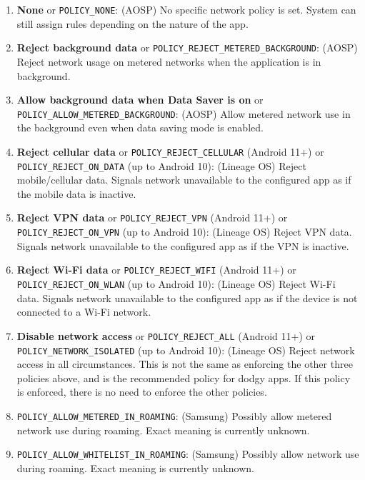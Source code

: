 \begin{enumerate}
    \item \textbf{None} or \texttt{POLICY\_NONE}: (AOSP) No specific network policy is set.
    System can still assign rules depending on the nature of the app.

    \item \textbf{Reject background data} or \texttt{POLICY\_REJECT\_METERED\_BACKGROUND}: (AOSP) Reject network usage on metered networks when the application is in background.

    \item \textbf{Allow background data when Data Saver is on} or \texttt{POLICY\_ALLOW\_METERED\_BACKGROUND}: (AOSP) Allow metered network use in the background even when data saving mode is enabled.

    \item \textbf{Reject cellular data} or \texttt{POLICY\_REJECT\_CELLULAR} (Android 11+) or \texttt{POLICY\_REJECT\_ON\_DATA} (up to Android 10): (Lineage OS) Reject mobile/cellular data.
    Signals network unavailable to the configured app as if the mobile data is inactive.

    \item \textbf{Reject VPN data} or \texttt{POLICY\_REJECT\_VPN} (Android 11+) or \texttt{POLICY\_REJECT\_ON\_VPN} (up to Android 10): (Lineage OS) Reject VPN data.
    Signals network unavailable to the configured app as if the VPN is inactive.

    \item \textbf{Reject Wi-Fi data} or \texttt{POLICY\_REJECT\_WIFI} (Android 11+) or \texttt{POLICY\_REJECT\_ON\_WLAN} (up to Android 10): (Lineage OS) Reject Wi-Fi data.
    Signals network unavailable to the configured app as if the device is not connected to a Wi-Fi network.

    \item \textbf{Disable network access} or \texttt{POLICY\_REJECT\_ALL} (Android 11+) or \texttt{POLICY\_NETWORK\_ISOLATED} (up to Android 10): (Lineage OS) Reject network access in all circumstances.
    This is not the same as enforcing the other three policies above, and is the recommended policy for dodgy apps.
    If this policy is enforced, there is no need to enforce the other policies.

    \item \texttt{POLICY\_ALLOW\_METERED\_IN\_ROAMING}: (Samsung) Possibly allow metered network use during roaming.
    Exact meaning is currently unknown.

    \item \texttt{POLICY\_ALLOW\_WHITELIST\_IN\_ROAMING}: (Samsung) Possibly allow network use during roaming.
    Exact meaning is currently unknown.
\end{enumerate}

